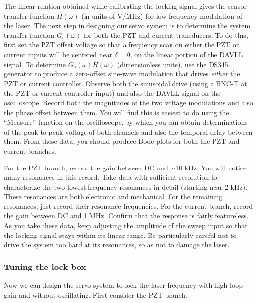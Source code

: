 \documentclass{../lab}
\begin{document}
The linear relation obtained while calibrating the locking signal gives the sensor transfer function $ H(\omega)$ (in units of V/MHz) for low-frequency modulation of the laser. The next step in designing our servo system is to determine the system transfer function $ G_s(\omega)$ for both the PZT and current transducers. To do this, first set the PZT offset voltage so that a frequency scan on either the PZT or current inputs will be centered near $\delta = 0$, on the linear portion of the DAVLL signal. To determine $ G_s(\omega)H(\omega)$ (dimensionless units), use the DS345 generator to produce a zero-offset sine-wave modulation that drives \emph{either} the PZT or current controller. Observe both the sinusoidal drive (using a BNC-T at the PZT or current controller input) and also the DAVLL signal on the oscilloscope. Record both the magnitudes of the two voltage modulations and also the phase offset between them. You will find this is easiest to do using the ``Measure'' function on the oscilloscope, by which you can obtain determinations of the peak-to-peak voltage of both channels and also the temporal delay between them. From these data, you should produce Bode plots for both the PZT and current branches.

For the PZT branch, record the gain between DC and $\sim$10 kHz. You will notice many resonances in this record. Take data with sufficient resolution to characterize the two lowest-frequency resonances in detail (starting near 2 kHz). These resonances are both electronic and mechanical. For the remaining resonances, just record their resonance frequencies. For the current branch, record the gain between DC and 1 MHz. Confirm that the response is fairly featureless. As you take these data, keep adjusting the amplitude of the sweep input so that the locking signal stays within its linear range. Be particularly careful not to drive the system too hard at its resonances, so as not to damage the laser.

\subsubsection{Tuning the lock box}

Now we can design the servo system to lock the laser frequency with high loop-gain and without oscillating. First consider the PZT branch.
\end{document}
